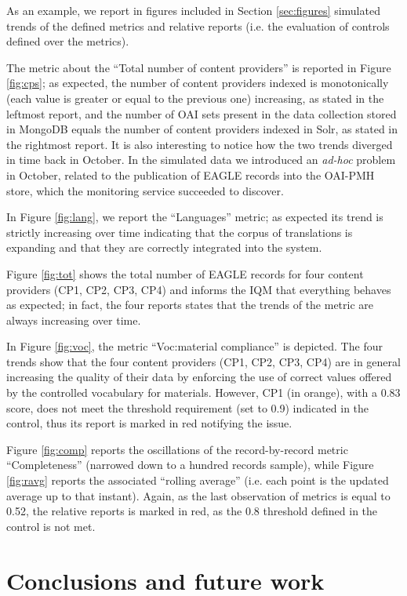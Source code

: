 \documentclass[amsthm,ebook]{saparticle}
\begin{document}
As an example, we report in figures included in Section \ref{sec:figures} simulated trends of the defined metrics and relative reports (i.e. the evaluation of controls defined over the metrics).

The metric about the ``Total number of content providers'' is reported in Figure \ref{fig:cps}; as expected, the number of content providers indexed is monotonically (each value is greater or equal to the previous one) increasing, as stated in the leftmost report, and the number of OAI sets present in the data collection stored in MongoDB equals the number of content providers indexed in Solr, as stated in the rightmost report. It is also interesting to notice how the two trends diverged in time back in October. In the simulated data we introduced an \textit{ad-hoc} problem in October, related to the publication of EAGLE records into the OAI-PMH store, which the monitoring service succeeded to discover.

In Figure \ref{fig:lang}, we report the ``Languages'' metric; as expected its trend is strictly increasing over time indicating that the corpus of translations is expanding and that they are correctly integrated into the system.

Figure \ref{fig:tot} shows the total number of EAGLE records for four content providers (CP1, CP2, CP3, CP4) and informs the IQM that everything behaves as expected; in fact, the four reports states that the trends of the metric are always increasing over time.

In Figure \ref{fig:voc}, the metric ``Voc:material compliance'' is depicted. The four trends show that the four content providers (CP1, CP2, CP3, CP4) are in general increasing the quality of their data by enforcing the use of correct values offered by the controlled vocabulary for materials. However, CP1 (in orange), with a 0.83 score, does not meet the threshold requirement (set to 0.9) indicated in the control, thus its report is marked in red notifying the issue.

Figure \ref{fig:comp} reports the oscillations of the record-by-record metric ``Completeness'' (narrowed down to a hundred records sample), while Figure \ref{fig:ravg} reports the associated ``rolling average'' (i.e. each point is the updated average up to that instant). Again, as the last observation of metrics is equal to 0.52, the relative reports is marked in red, as the 0.8 threshold defined in the control is not met.


\section{Conclusions and future work}\label{sec:conclusions}
\end{document}
